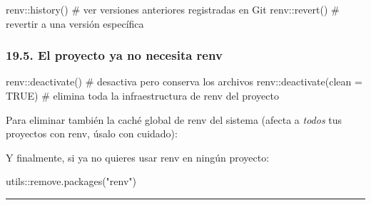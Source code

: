 \documentclass[
  man,
  floatsintext,
  longtable,
  a4paper,
  nolmodern,
  notxfonts,
  notimes,
  12pt,
  colorlinks=true,linkcolor=blue,citecolor=blue,urlcolor=blue]{apa7}
\newenvironment{Shaded}{\begin{snugshade}}{\end{snugshade}}
\newcommand{\AttributeTok}[1]{\textcolor[rgb]{0.40,0.45,0.13}{#1}}
\newcommand{\CommentTok}[1]{\textcolor[rgb]{0.37,0.37,0.37}{#1}}
\newcommand{\ConstantTok}[1]{\textcolor[rgb]{0.56,0.35,0.01}{#1}}
\newcommand{\FunctionTok}[1]{\textcolor[rgb]{0.28,0.35,0.67}{#1}}
\newcommand{\NormalTok}[1]{\textcolor[rgb]{0.00,0.23,0.31}{#1}}
\newcommand{\OtherTok}[1]{\textcolor[rgb]{0.00,0.23,0.31}{#1}}
\newcommand{\SpecialCharTok}[1]{\textcolor[rgb]{0.37,0.37,0.37}{#1}}
\newcommand{\StringTok}[1]{\textcolor[rgb]{0.13,0.47,0.30}{#1}}
\begin{document}
\begin{Shaded}
\begin{Highlighting}[]
\NormalTok{renv}\SpecialCharTok{::}\FunctionTok{history}\NormalTok{()   }\CommentTok{\# ver versiones anteriores registradas en Git}
\NormalTok{renv}\SpecialCharTok{::}\FunctionTok{revert}\NormalTok{()    }\CommentTok{\# revertir a una versión específica}
\end{Highlighting}
\end{Shaded}

\subsubsection{19.5. El proyecto ya no necesita
renv}\label{el-proyecto-ya-no-necesita-renv}

\begin{Shaded}
\begin{Highlighting}[]
\NormalTok{renv}\SpecialCharTok{::}\FunctionTok{deactivate}\NormalTok{()              }\CommentTok{\# desactiva pero conserva los archivos}
\NormalTok{renv}\SpecialCharTok{::}\FunctionTok{deactivate}\NormalTok{(}\AttributeTok{clean =} \ConstantTok{TRUE}\NormalTok{)  }\CommentTok{\# elimina toda la infraestructura de renv del proyecto}
\end{Highlighting}
\end{Shaded}

Para eliminar también la caché global de renv del sistema (afecta a
\emph{todos} tus proyectos con renv, úsalo con cuidado):

\begin{Shaded}
\end{Shaded}

Y finalmente, si ya no quieres usar renv en ningún proyecto:

\begin{Shaded}
\begin{Highlighting}[]
\NormalTok{utils}\SpecialCharTok{::}\FunctionTok{remove.packages}\NormalTok{(}\StringTok{"renv"}\NormalTok{)}
\end{Highlighting}
\end{Shaded}

\begin{center}\rule{0.5\linewidth}{0.5pt}\end{center}
\end{document}
